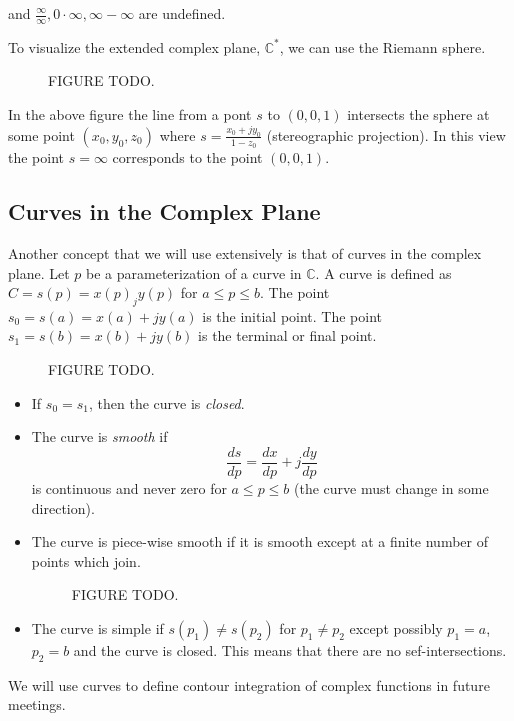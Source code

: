 \documentclass{article}
\begin{document}
and $\frac{\infty}{\infty}, 0\cdot\infty, \infty-\infty$ are undefined.

To visualize the extended complex plane, $\mathbb{C}^*$, we can use the Riemann sphere.

\begin{figure}
  \centering
  \caption{FIGURE TODO.}
\end{figure}

In the above figure the line from a pont $s$ to $(0,0,1)$ intersects the sphere at some point $(x_0,y_0,z_0)$ where $s = \frac{x_0 + jy_0}{1-z_0}$ (stereographic projection). In this view the point $s = \infty$ corresponds to the point $(0,0,1)$.

\subsection{Curves in the Complex Plane}

Another concept that we will use extensively is that of curves in the complex plane. Let $p$ be a parameterization of a curve in $\mathbb{C}$. A curve is defined as $C = s(p) = x(p) _ jy(p)$ for $a \leq p \leq b$. The point $s_0 = s(a) = x(a) + jy(a)$ is the initial point. The point $s_1 = s(b) = x(b) + jy(b)$ is the terminal or final point.

\begin{figure}
  \centering
  \caption{FIGURE TODO.}
\end{figure}

\begin{itemize}
\item If $s_0 = s_1$, then the curve is \textit{closed}.
\item The curve is \textit{smooth} if
  \[
  \frac{ds}{dp} = \frac{dx}{dp} + j \frac{dy}{dp} 
  \]
  is continuous and never zero for $a \leq p \leq b$ (the curve must change in some direction).
\item The curve is piece-wise smooth if it is smooth except at a finite number of points which join.
  
\begin{figure}
  \centering
  \caption{FIGURE TODO.}
\end{figure}

\item The curve is simple if $s(p_1) \neq s(p_2)$ for $p_1 \neq p_2$ except possibly $p_1=a$, $p_2 = b$ and the curve is closed. This means that there are no sef-intersections. 
\end{itemize}

We will use curves to define contour integration of complex functions in future meetings.
\end{document}
